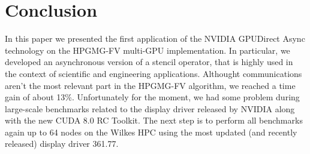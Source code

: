 \documentclass[conference]{IEEEtran}
\begin{document}
%






\section{Conclusion}

In this paper we presented the first application of the NVIDIA GPUDirect Async technology on the HPGMG-FV multi-GPU implementation.
In particular, we developed an asynchronous version of a stencil operator, that is highly used in the context of scientific and engineering applications.
Althought communications aren't the most relevant part in the HPGMG-FV algorithm, we reached a time gain of about 13\%.
Unfortunately for the moment, we had some problem during large-scale benchmarks related to the display driver released by NVIDIA along with the new CUDA 8.0 RC Toolkit.
The next step is to perform all benchmarks again up to 64 nodes on the Wilkes HPC using the most updated (and recently released) display driver 361.77.
\end{document}
